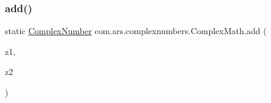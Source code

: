 \subsubsection{\texorpdfstring{add()}{add()}\hspace{0.1cm}{\footnotesize\ttfamily [1/2]}}
{\footnotesize\ttfamily static \hyperlink{classcom_1_1ars_1_1complexnumbers_1_1_complex_number}{Complex\+Number} com.\+ars.\+complexnumbers.\+Complex\+Math.\+add (\begin{DoxyParamCaption}\item[{\hyperlink{classcom_1_1ars_1_1complexnumbers_1_1_complex_number}{Complex\+Number}}]{z1,  }\item[{\hyperlink{classcom_1_1ars_1_1complexnumbers_1_1_complex_number}{Complex\+Number}}]{z2 }\end{DoxyParamCaption})\hspace{0.3cm}{\ttfamily [static]}}

